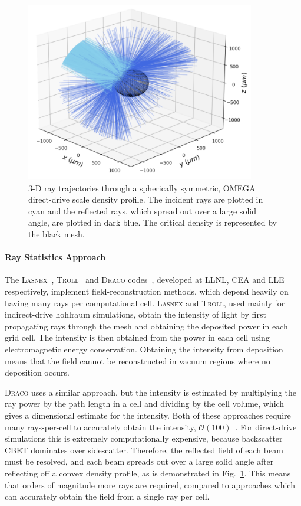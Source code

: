 \begin{figure}[t!]
\includegraphics[width=10cm]{Numerics/Images/Reflected_Rays.png}
\centering
\caption{3-D ray trajectories through a spherically symmetric, OMEGA direct-drive scale density profile.
The incident rays are plotted in cyan and the reflected rays, which spread out over a large solid angle, are plotted in dark blue.
The critical density is represented by the black mesh.}%
\label{fig:reflectedrays}
\end{figure}

\paragraph*{Ray Statistics Approach} The \textsc{Lasnex}~\cite{strozzi_interplay_2017}, \textsc{Troll}~\cite{liberatore_first_2023} and \textsc{Draco} codes~\cite{marozas_wavelength-detuning_2018}, developed at \ac{LLNL}, \ac{CEA} and \ac{LLE} respectively, implement field-reconstruction methods, which depend heavily on having many rays per computational cell.
\textsc{Lasnex} and \textsc{Troll}, used mainly for indirect-drive hohlraum simulations, obtain the intensity of light by first propagating rays through the mesh and obtaining the deposited power in each grid cell.
The intensity is then obtained from the power in each cell using electromagnetic energy conservation.
Obtaining the intensity from deposition means that the field cannot be reconstructed in vacuum regions where no deposition occurs.

\textsc{Draco} uses a similar approach, but the intensity is estimated by multiplying the ray power by the path length in a cell and dividing by the cell volume, which gives a dimensional estimate for the intensity.
Both of these approaches require many rays-per-cell to accurately obtain the intensity, $\mathcal{O}(100)$~\cite{debayle_unified_2019}.
For direct-drive simulations this is extremely computationally expensive, because backscatter \ac{CBET} dominates over sidescatter.
Therefore, the reflected field of each beam must be resolved, and each beam spreads out over a large solid angle after reflecting off a convex density profile, as is demonstrated in Fig.~\ref{fig:reflectedrays}.
This means that orders of magnitude more rays are required, compared to approaches which can accurately obtain the field from a single ray per cell.

